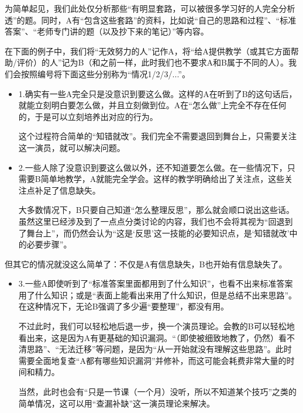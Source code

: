 \begin{explain}
为简单起见，我们此处仅分析那些“有明显套路，可以被很多学习好的人完全分析透”的题。同时，A有“包含这些套路”的资料，比如说“自己的思路和过程”、“标准答案”、“老师专门讲的题（以及抄下来的笔记）”等内容。

在下面的例子中，我们将“无效努力的人”记作A，将“给A提供教学（或其它方面帮助/评价）的人”记为B（和之前一样，此时我们也不要求A和B属于不同的人）。我们会按照编号将下面这些分别称为“情况1/2/3/...”。
\begin{itemize}
\item 1.确实有一些A完全只是没意识到要这么做。这样的A在听到了B的这句话后，就能立刻明白要怎么做，并且立刻做到位。A在“怎么做”上完全不存在任何的，于是可以立刻培养出对应的行为。

这个过程符合简单的“知错就改”。我们完全不需要退回到舞台上，只需要关注这一演员，就可以解决问题。

\item 2.一些人除了没意识到要这么做以外，还不知道要怎么做。在一些情况下，只需要B简单地教学，A就能完全学会。这样的教学明确给出了关注点，这些关注点补足了信息缺失。

大多数情况下，B只要自己知道“怎么整理反思”，那么就会顺口说出这些话。虽然这里已经涉及到了一点点分类讨论的内容，我们也不会将其视为“回退到了舞台上”，而仍然会认为“这是‘反思’这一技能的必要知识点，是‘知错就改’中的必要步骤”。
\end{itemize}
\insertparanotes
\end{explain}
但其它的情况就没这么简单了：不仅是A有信息缺失，B也开始有信息缺失了。
\begin{explain}
\begin{itemize}
\item 3.一些A即使听到了“标准答案里面都用到了什么知识”，也看不出来标准答案用了什么知识；或是“表面上能看出来用了什么知识，但是总结不出来思路”。在这种情况下，无论B强调了多少遍“要整理”，都没有用。

不过此时，我们可以轻松地后退一步，换一个演员理论。会教的B可以轻松地看出来，这是因为A有更基础的知识漏洞。“（即使被细致地教了，仍然）看不清思路”、“无法迁移”等问题，是因为“从一开始就没有理解这些思路”。此时需要全面地复查“A都有哪些知识漏洞”并修补，而这可能会耗费非常大量的时间和精力。

当然，此时也会有“只是一节课（一个月）没听，所以不知道某个技巧”之类的简单情况，这可以用“查漏补缺”这一演员理论来解决。
\insertparanotes
\end{itemize}
\end{explain}
